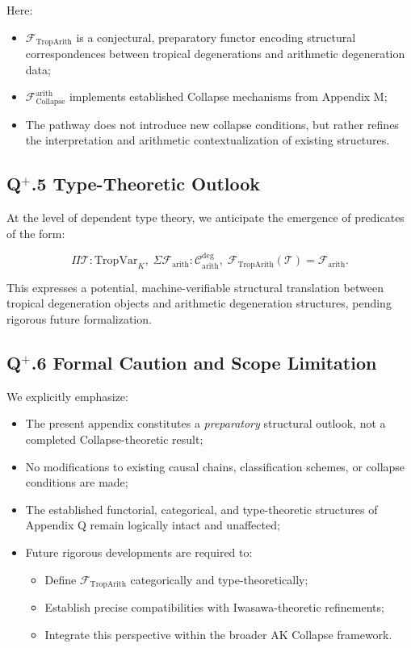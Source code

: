 \documentclass[11pt]{article}
\begin{document}
Here:

\begin{itemize}
    \item $\mathcal{F}_{\mathrm{TropArith}}$ is a conjectural, preparatory functor encoding structural correspondences between tropical degenerations and arithmetic degeneration data;
    \item $\mathcal{F}_{\mathrm{Collapse}}^{\mathrm{arith}}$ implements established Collapse mechanisms from Appendix M;
    \item The pathway does not introduce new collapse conditions, but rather refines the interpretation and arithmetic contextualization of existing structures.
\end{itemize}

\subsection*{Q$^{+}$.5 Type-Theoretic Outlook}

At the level of dependent type theory, we anticipate the emergence of predicates of the form:

\[
\Pi \mathcal{T} : \mathrm{TropVar}_K,\;
\Sigma \mathcal{F}_{\mathrm{arith}} : \mathcal{C}_{\mathrm{arith}}^{\mathrm{deg}},\;
\mathcal{F}_{\mathrm{TropArith}}(\mathcal{T}) = \mathcal{F}_{\mathrm{arith}}.
\]

This expresses a potential, machine-verifiable structural translation between tropical degeneration objects and arithmetic degeneration structures, pending rigorous future formalization.

\subsection*{Q$^{+}$.6 Formal Caution and Scope Limitation}

We explicitly emphasize:

\begin{itemize}
    \item The present appendix constitutes a \emph{preparatory} structural outlook, not a completed Collapse-theoretic result;
    \item No modifications to existing causal chains, classification schemes, or collapse conditions are made;
    \item The established functorial, categorical, and type-theoretic structures of Appendix Q remain logically intact and unaffected;
    \item Future rigorous developments are required to:
    \begin{itemize}
        \item Define $\mathcal{F}_{\mathrm{TropArith}}$ categorically and type-theoretically;
        \item Establish precise compatibilities with Iwasawa-theoretic refinements;
        \item Integrate this perspective within the broader AK Collapse framework.
    \end{itemize}
\end{itemize}
\end{document}
